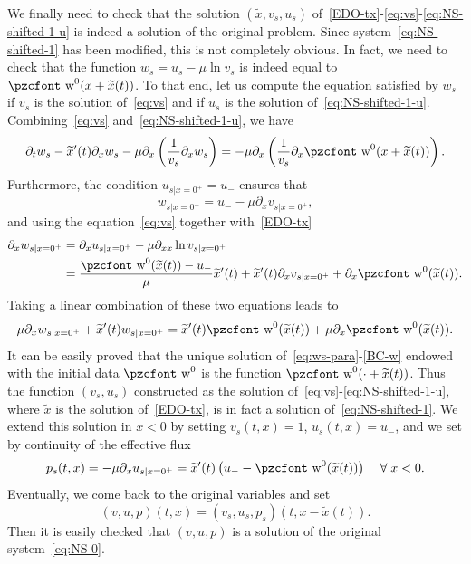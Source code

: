 \documentclass[10pt]{amsart}
\theoremstyle{definition}\newtheorem{defi}[theo]{Definition}\newtheorem{rema}[theo]{Remark}\newtheorem{exam}[theo]{Example}\newtheorem{exem}[theo]{Example}\newtheorem{nota}[theo]{Notation}
\newcommand{\mathpzc}[1]{\text{\pzcfont #1}}
\newcommand{\p}{\partial}
\newcommand{\tw}{\mathpzc{w}}
\newcommand{\tx}{\widetilde{x}}
\let\oldtilde\tilde
\renewcommand*{\tilde}[1]{\mathchoice{\widetilde{#1}}{\widetilde{#1}}{\oldtilde{#1}}{\oldtilde{#1}}}
\let\oldforall\forall
\renewcommand*{\forall}{\mathrel{\oldforall}}
\begin{document}
We finally need to check that the solution $(\tx, v_s, u_s)$ of~\eqref{EDO-tx}-\eqref{eq:vs}-\eqref{eq:NS-shifted-1-u} is indeed a solution of the original problem. Since system~\eqref{eq:NS-shifted-1} has been modified, this is not completely obvious. In fact, we need to check that the function $w_s=u_s-\mu \ln v_s$ is indeed equal to $\tw^0 (x+\tx(t))$. To that end, let us compute the equation satisfied by $w_s$ if $v_s$ is the solution of~\eqref{eq:vs} and if $u_s$ is the solution of~\eqref{eq:NS-shifted-1-u}. Combining~\eqref{eq:vs} and~\eqref{eq:NS-shifted-1-u}, we have
\begin{equation}\label{eq:ws-para}
\p_t w_s - \tilde x'(t) \p_x w_s -\mu \p_x\left(\frac{1}{v_s}\p_x w_s\right)=-\mu \p_x\left(\frac{1}{v_s}\p_x \tw^0(x+\tx(t))\right).
\end{equation}
Furthermore, the condition $u_{s|x=0^+}=u_-$ ensures that
\[
w_{s|x=0^+}= u_-- \mu \p_x v_{s |x=0^+},
\]
and using the equation~\eqref{eq:vs} together with~\eqref{EDO-tx}
\begin{align*}
\p_x w_{s|x=0^+} & = \p_x u_{s|x=0^+} - \mu \p_{xx} \ln v_{s|x=0^+} \\
& = \frac{\tw^0(\tx(t))-u_-}{\mu}\tx'(t) + \tx'(t) \p_x v_{s|x=0^+} + \p_x \tw^0(\tx(t)).
\end{align*}
Taking a linear combination of these two equations leads to
\begin{equation}\label{BC-w}
\mu \p_x w_{s|x=0^+} + \tx'(t) w_{s|x=0^+} = \tx'(t)\tw^0(\tx(t)) + \mu \p_x \tw^0(\tx(t)).
\end{equation}
It can be easily proved that the unique solution of~\eqref{eq:ws-para}-\eqref{BC-w} endowed with the initial data $\tw^0$ is the function $\tw^0(\cdot+\tx(t))$. Thus the function $(v_s,u_s)$ constructed as the solution of~\eqref{eq:vs}-\eqref{eq:NS-shifted-1-u}, where $\tx$ is the solution of~\eqref{EDO-tx}, is in fact a solution of~\eqref{eq:NS-shifted-1}. We extend this solution in $x<0$ by setting $v_s(t,x)=1$, $u_s(t,x)=u_-$, and we set by continuity of the effective flux
\[
p_s(t,x)=-\mu\p_x u_{s|x=0^+}= \tx'(t)\left(u_--\tw^0(\tx(t))\right)\quad \forall x<0.
\]
Eventually, we come back to the original variables and set
\[
(v,u,p)(t,x)=(v_s,u_s,p_s)(t,x-\tx(t)).
\]
Then it is easily checked that $(v,u,p)$ is a solution of the original system~\eqref{eq:NS-0}.
\end{document}
